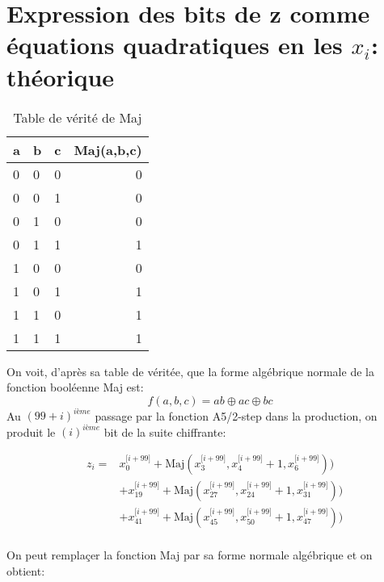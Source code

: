 \section{Expression des bits de z comme équations quadratiques en les $x_i$: théorique}
\begin{table}[h!]
\centering
\begin{tabular}{l l l|r}
a & b & c & Maj(a,b,c) \\\hline
0 & 0 & 0 & 0  \\
0 & 0 & 1 & 0 \\
0 & 1 & 0 & 0 \\
0 & 1 & 1 & 1 \\
1 & 0 & 0 & 0  \\
1 & 0 & 1 & 1 \\
1 & 1 & 0 & 1 \\
1 & 1 & 1 & 1 \\

\end{tabular}
\caption{\label{tab:widgets}Table de vérité de Maj}
\end{table}

On voit, d'après sa table de véritée, que la forme algébrique normale de la fonction booléenne Maj est:
$$f(a,b,c) = ab \oplus ac \oplus bc$$
Au $(99+i)^{ième}$ passage par la fonction A5/2-step dans la production, on produit le $(i)^{ième}$ bit de la suite chiffrante: 

\begin{equation}
\begin{aligned}
  &z_i =& x^{\lbrack i + 99\rbrack}_0 + \mbox{Maj}(x^{\lbrack i+99\rbrack}_{3}, x^{\lbrack i+99\rbrack}_{4} + 1, x^{\lbrack i+99\rbrack}_{6})) \\
  & &+ x^{\lbrack i + 99\rbrack}_{19} + \mbox{Maj}(x^{\lbrack i+99\rbrack}_{27}, x^{\lbrack i+99\rbrack}_{24} + 1, x^{\lbrack i+99\rbrack}_{31})) \\
  & &+ x^{\lbrack i + 99\rbrack}_{41} + \mbox{Maj}(x^{\lbrack i+99\rbrack}_{45}, x^{\lbrack i+99\rbrack}_{50} + 1, x^{\lbrack i+99\rbrack}_{47})) \\
\end{aligned}
\end{equation}

On peut remplaçer la fonction Maj par sa forme normale algébrique et on obtient:

